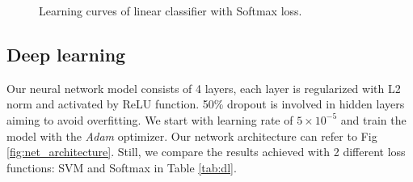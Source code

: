 \documentclass[10pt,twocolumn,letterpaper]{article}
\begin{document}
\begin{figure}[htbp]
	\centering
	\caption{Learning curves of linear classifier with Softmax loss.}
	\label{fig:lc_softmax}
\end{figure}

\subsection{Deep learning}
	Our neural network model consists of 4 layers, each layer is regularized with L2 norm and activated by ReLU function. 50\% dropout \cite{dropout} is involved in hidden layers aiming to avoid overfitting. We start with learning rate of $5 \times 10^{-5}$ and train the model with the \emph{Adam} optimizer. Our network architecture can refer to Fig \ref{fig:net_architecture}. Still, we compare the results achieved with 2 different loss functions: SVM and Softmax in Table \ref{tab:dl}.
	
\end{document}
